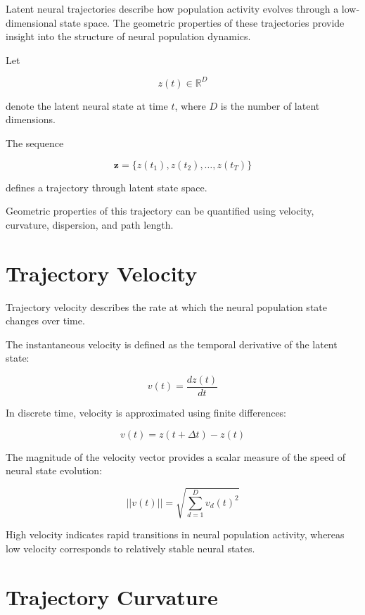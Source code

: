 \documentclass[11pt]{report}
\begin{document}
Latent neural trajectories describe how population activity evolves
through a low-dimensional state space. The geometric properties of
these trajectories provide insight into the structure of neural
population dynamics.

Let

\begin{equation}
z(t) \in \mathbb{R}^{D}
\end{equation}

denote the latent neural state at time $t$, where $D$ is the number
of latent dimensions.

The sequence

\begin{equation}
\mathbf{z} = \{z(t_1), z(t_2), \dots, z(t_T)\}
\end{equation}

defines a trajectory through latent state space.

Geometric properties of this trajectory can be quantified using
velocity, curvature, dispersion, and path length.

\section{Trajectory Velocity}

Trajectory velocity describes the rate at which the neural population
state changes over time.

The instantaneous velocity is defined as the temporal derivative of
the latent state:

\begin{equation}
v(t) =
\frac{d z(t)}{dt}
\end{equation}

In discrete time, velocity is approximated using finite differences:

\begin{equation}
v(t) =
z(t+\Delta t) - z(t)
\end{equation}

The magnitude of the velocity vector provides a scalar measure of
the speed of neural state evolution:

\begin{equation}
||v(t)|| =
\sqrt{\sum_{d=1}^{D} v_d(t)^2}
\end{equation}

High velocity indicates rapid transitions in neural population
activity, whereas low velocity corresponds to relatively stable
neural states.

\section{Trajectory Curvature}
\end{document}
